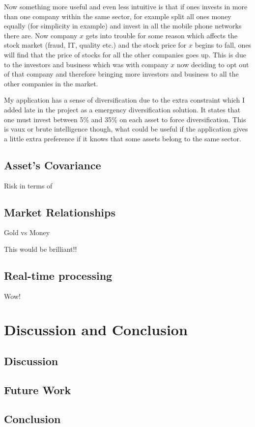 \documentclass{pdfmx4020}
\begin{document}
    Now something more useful and even less intuitive is that if ones invests in more than one company within the same sector, for example split all ones money equally (for simplicity in example) and invest in all the mobile phone networks there are. Now company $x$ gets into trouble for some reason which affects the stock market (fraud, IT, quality etc.) and the stock price for $x$ begins to fall, ones will find that the price of stocks for all the other companies goes up. This is due to the investors and business which was with company $x$ now deciding to opt out of that company and therefore bringing more investors and business to all the other companies in the market. 

    My application has a sense of diversification due to the extra constraint which I added late in the project as a emergency diversification solution. It states that one must invest between 5\% and 35\% on each asset to force diversification. This is vaux or brute intelligence though, what could be useful if the application gives a little extra preference if it knows that some assets belong to the same sector. 

  
  \section{Asset's Covariance} %
  \label{sec:covariance}
    Risk in terms of 

  \section{Market Relationships} %
  \label{sec:market_relationships}
    Gold vs Money

    This would be brilliant!!

  \section{Real-time processing} %
  \label{sec:real_time_processing}
    Wow!


\chapter{Discussion and Conclusion}

  \section{Discussion} %
  \label{sec:discussion}
  

  \section{Future Work} %
  \label{sec:future_work}
  

  \section{Conclusion} %
  \label{sec:conclusion}
  






\end{document}
